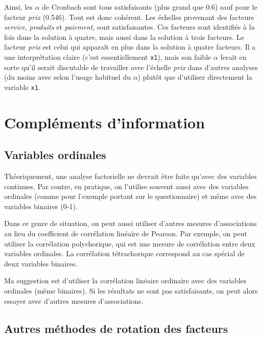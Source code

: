 \documentclass[
  11pt,
  letterpaper,
]{scrbook}
\theoremstyle{definition}
\theoremstyle{remark}
\begin{document}
Ainsi, les \(\alpha\) de Cronbach sont tous satisfaisants (plus grand
que 0.6) sauf pour le facteur \emph{prix} (0.546). Tout est donc
cohérent. Les échelles provenant des facteurs \emph{service},
\emph{produits} et \emph{paiement}, sont satisfaisantes. Ces facteurs
sont identifiés à la fois dans la solution à quatre, mais aussi dans la
solution à trois facteurs. Le facteur \emph{prix} est celui qui apparaît
en plus dans la solution à quatre facteurs. Il a une interprétation
claire (c'est essentiellement \texttt{x1}), mais son faible \(\alpha\)
ferait en sorte qu'il serait discutable de travailler avec l'échelle
\emph{prix} dans d'autres analyses (du moins avec selon l'usage habituel
du \(\alpha\)) plutôt que d'utiliser directement la variable
\texttt{x1}.

\section{Compléments d'information}\label{compluxe9ments-dinformation}

\subsection{Variables ordinales}\label{variables-ordinales}

Théoriquement, une analyse factorielle ne devrait être faite qu'avec des
variables continues. Par contre, en pratique, on l'utilise souvent aussi
avec des variables ordinales (comme pour l'exemple portant sur le
questionnaire) et même avec des variables binaires (0-1).

Dans ce genre de situation, on peut aussi utiliser d'autres mesures
d'associations au lieu du coefficient de corrélation linéaire de
Pearson. Par exemple, on peut utiliser la corrélation polychorique, qui
est une mesure de corrélation entre deux variables ordinales. La
corrélation tétrachorique correspond au cas spécial de deux variables
binaires.

Ma suggestion est d'utiliser la corrélation linéaire ordinaire avec des
variables ordinales (même binaires). Si les résultats ne sont pas
satisfaisants, on peut alors essayer avec d'autres mesures
d'associations.

\subsection{Autres méthodes de rotation des
facteurs}\label{autres-muxe9thodes-de-rotation-des-facteurs}
\end{document}
